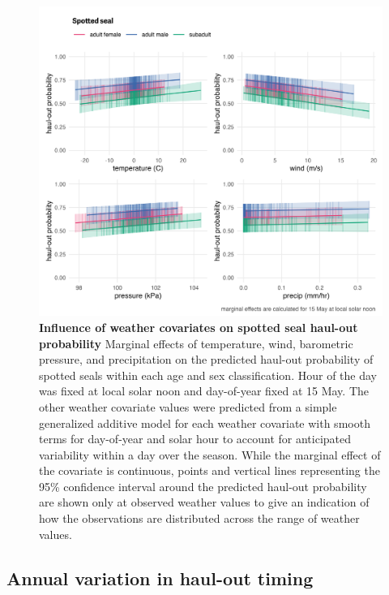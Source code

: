 \documentclass[fleqn,10pt,lineno]{wlpeerj} %
\begin{document}
\begin{figure}
\includegraphics[width=1\linewidth]{../figures/spottedHOwx-1} \caption{\textbf{Influence of weather covariates on spotted seal haul-out probability} \linebreak Marginal effects of temperature, wind, barometric pressure, and precipitation on the predicted haul-out probability of spotted seals within each age and sex classification. Hour of the day was fixed at local solar noon and day-of-year fixed at 15 May. The other weather covariate values were predicted from a simple generalized additive model for each weather covariate with smooth terms for day-of-year and solar hour to account for anticipated variability within a day over the season. While the marginal effect of the covariate is continuous, points and vertical lines representing the 95\% confidence interval around the predicted haul-out probability are shown only at observed weather values to give an indication of how the observations are distributed across the range of weather values.}\label{fig:spottedHOwx}
\end{figure}

\hypertarget{annual-variation-in-haul-out-timing}{%
\subsection*{Annual variation in haul-out timing}\label{annual-variation-in-haul-out-timing}}
\end{document}
